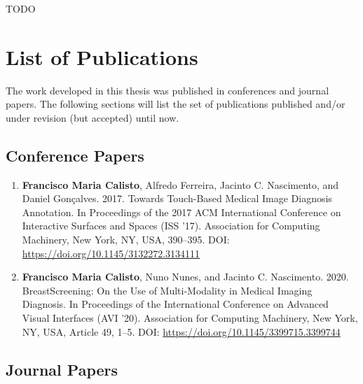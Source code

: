 TODO

\clearpage

\section{List of Publications}
\label{sec:sec001006}

The work developed in this thesis was published in conferences and journal papers. The following sections will list the set of publications published and/or under revision (but accepted) until now.

\subsection{Conference Papers}
\label{sec:sec00100601}

\begin{enumerate}
\item {\bf Francisco Maria Calisto}, Alfredo Ferreira, Jacinto C. Nascimento, and Daniel Gonçalves. 2017. Towards Touch-Based Medical Image Diagnosis Annotation. In Proceedings of the 2017 ACM International Conference on Interactive Surfaces and Spaces (ISS '17). Association for Computing Machinery, New York, NY, USA, 390–395. DOI: \href{https://doi.org/10.1145/3132272.3134111}{https://doi.org/10.1145/3132272.3134111}
\item {\bf Francisco Maria Calisto}, Nuno Nunes, and Jacinto C. Nascimento. 2020. BreastScreening: On the Use of Multi-Modality in Medical Imaging Diagnosis. In Proceedings of the International Conference on Advanced Visual Interfaces (AVI '20). Association for Computing Machinery, New York, NY, USA, Article 49, 1–5. DOI: \href{https://doi.org/10.1145/3399715.3399744}{https://doi.org/10.1145/3399715.3399744}
\end{enumerate}

\subsection{Journal Papers}
\label{sec:sec00100602}

